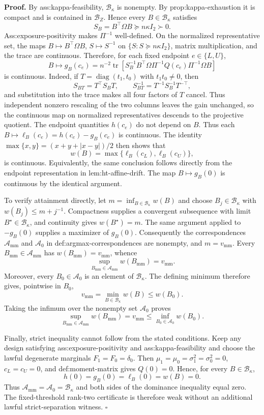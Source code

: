 \textbf{Proof.}
By ass:kappa-feasibility, \(\mathcal B_\kappa\) is nonempty.  By prop:kappa-exhaustion it is compact and is contained in \(\mathcal B_Z\).  Hence every \(B\in\mathcal B_\kappa\) satisfies
\[
S_B=B^{\top}\Omega B\succeq n\kappa I_2\succ0.
\]
Ass:exposure-positivity makes \(\Pi^{-1}\) well-defined.  On the normalized representative set, the maps \(B\mapsto B^{\top}\Omega B\), \(S\mapsto S^{-1}\) on \(\{S:S\succeq n\kappa I_2\}\), matrix multiplication, and the trace are continuous.  Therefore, for each fixed endpoint \(e\in\{L,U\}\),
\[
B\longmapsto g_B(c_e)
=n^{-2}\operatorname{tr}\!\left[
S_B^{-1}B^{\top}\Omega\Pi^{-1}Q(c_e)\Pi^{-1}\Omega B
\right]
\]
is continuous.  Indeed, if \(T=\operatorname{diag}(t_1,t_0)\) with \(t_1t_0\ne0\), then
\[
S_{BT}=T^{\top}S_BT,
\qquad
S_{BT}^{-1}=T^{-1}S_B^{-1}T^{-\top},
\]
and substitution into the trace makes all four factors of \(T\) cancel.  Thus independent nonzero rescaling of the two columns leaves the gain unchanged, so the continuous map on normalized representatives descends to the projective quotient.  The endpoint quantities \(h(c_e)\) do not depend on \(B\).  Thus each \(B\mapsto\ell_B(c_e)=h(c_e)-g_B(c_e)\) is continuous.  The identity \(\max\{x,y\}=(x+y+|x-y|)/2\) then shows that
\[
w(B)=\max\{\ell_B(c_L),\ell_B(c_U)\},
\]
is continuous.  Equivalently, the same conclusion follows directly from the endpoint representation in lem:ht-affine-drift.  The map \(B\mapsto g_B(0)\) is continuous by the identical argument.

To verify attainment directly, let \(m=\inf_{B\in\mathcal B_\kappa}w(B)\) and choose \(B_j\in\mathcal B_\kappa\) with \(w(B_j)\le m+j^{-1}\).  Compactness supplies a convergent subsequence with limit \(B^\star\in\mathcal B_\kappa\), and continuity gives \(w(B^\star)=m\).  The same argument applied to \(-g_B(0)\) supplies a maximizer of \(g_B(0)\).  Consequently the correspondences \(\mathcal A_{\mathrm{mm}}\) and \(\mathcal A_0\) in def:argmax-correspondences are nonempty, and \(m=v_{\mathrm{mm}}\).  Every \(B_{\mathrm{mm}}\in\mathcal A_{\mathrm{mm}}\) has \(w(B_{\mathrm{mm}})=v_{\mathrm{mm}}\), whence
\[
\sup_{B_{\mathrm{mm}}\in\mathcal A_{\mathrm{mm}}}w(B_{\mathrm{mm}})
=v_{\mathrm{mm}}.
\]
Moreover, every \(B_0\in\mathcal A_0\) is an element of \(\mathcal B_\kappa\).  The defining minimum therefore gives, pointwise in \(B_0\),
\[
v_{\mathrm{mm}}
=\min_{B\in\mathcal B_\kappa}w(B)
\le w(B_0).
\]
Taking the infimum over the nonempty set \(\mathcal A_0\) proves
\[
\sup_{B_{\mathrm{mm}}\in\mathcal A_{\mathrm{mm}}}w(B_{\mathrm{mm}})
=v_{\mathrm{mm}}
\le
\inf_{B_0\in\mathcal A_0}w(B_0).
\]

Finally, strict inequality cannot follow from the stated conditions.  Keep any design satisfying ass:exposure-positivity and ass:kappa-feasibility and choose the lawful degenerate marginals \(F_1=F_0=\delta_0\).  Then \(\mu_1=\mu_0=\sigma_1^2=\sigma_0^2=0\), \(c_L=c_U=0\), and def:moment-matrix gives \(Q(0)=0\).  Hence, for every \(B\in\mathcal B_\kappa\),
\[
h(0)=g_B(0)=\ell_B(0)=w(B)=0.
\]
Thus \(\mathcal A_{\mathrm{mm}}=\mathcal A_0=\mathcal B_\kappa\) and both sides of the dominance inequality equal zero.  The fixed-threshold rank-two certificate is therefore weak without an additional lawful strict-separation witness. \(\square\)